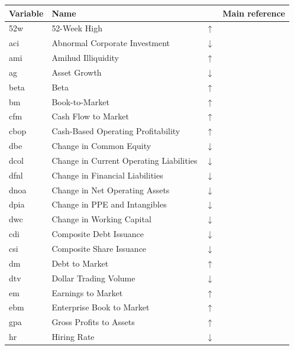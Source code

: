 \documentclass[
  article]{jss}
\begin{document}
\begin{longtable}{lp{5.5cm}lp{6.5cm}}

\toprule
Variable & Name &  & Main reference\\
\midrule
52w & 52-Week High & $\uparrow$ & \cite{george.2004}\\
aci & Abnormal Corporate Investment & $\downarrow$ & \cite{titman.2004}\\
ami & Amihud Illiquidity & $\uparrow$ & \cite{amihud.2002}\\
ag & Asset Growth & $\downarrow$ & \cite{cooper.2008}\\
beta & Beta & $\uparrow$ & \cite{fama.1973}\\
\addlinespace
bm & Book-to-Market & $\uparrow$ & \cite{daniel.2006}\\
cfm & Cash Flow to Market & $\uparrow$ & \cite{lakonishok.1994}\\
cbop & Cash-Based Operating Profitability & $\uparrow$ & \cite{ball.2016}\\
dbe & Change in Common Equity & $\downarrow$ & \cite{richardson.2005}\\
dcol & Change in Current Operating Liabilities & $\downarrow$ & \cite{richardson.2005}\\
\addlinespace
dfnl & Change in Financial Liabilities & $\downarrow$ & \cite{richardson.2005}\\
dnoa & Change in Net Operating Assets & $\downarrow$ & \cite{hirshleifer.2004}\\
dpia & Change in PPE and Intangibles & $\downarrow$ & \cite{lyandres.2008}\\
dwc & Change in Working Capital & $\downarrow$ & \cite{richardson.2005}\\
cdi & Composite Debt Issuance & $\downarrow$ & \cite{lyandres.2008}\\
\addlinespace
csi & Composite Share Issuance & $\downarrow$ & \cite{daniel.2006}\\
dm & Debt to Market & $\uparrow$ & \cite{bhandari.1988}\\
dtv & Dollar Trading Volume & $\downarrow$ & \cite{brennan.1998}\\
em & Earnings to Market & $\uparrow$ & \cite{basu.1983}\\
ebm & Enterprise Book to Market & $\uparrow$ & \cite{penman.2007}\\
\addlinespace
gpa & Gross Profits to Assets & $\uparrow$ & \cite{novy-marx.2013}\\
hr & Hiring Rate & $\downarrow$ & \cite{belo.2014}\\

\end{longtable}
\end{document}
